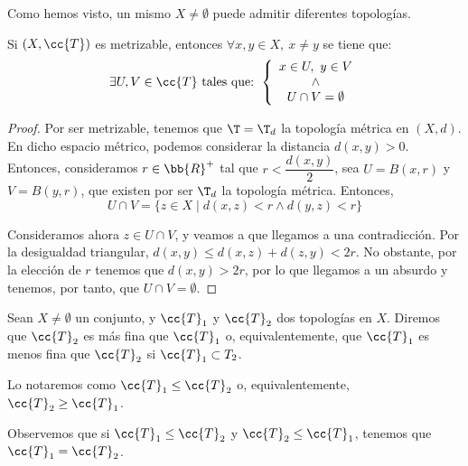 Como hemos visto, un mismo $X\neq \emptyset$ puede admitir diferentes topologías.


\begin{lema}\label{lema:Metrizable}
    Si $(X,\cc{T})$ es metrizable, entonces $\forall x,y\in X,~x\neq y$ se tiene que:
    \begin{equation*}
        \exists U,V\in \cc{T} \text{ tales que: }
        \left\{
        \begin{array}{c}
            x\in U,~y\in V\\
            \land\\
            U\cap V=\emptyset
        \end{array}
        \right.
    \end{equation*}
\end{lema}
\begin{proof}
    Por ser metrizable, tenemos que $\T=\T_d$ la topología métrica en $(X,d)$. En dicho espacio métrico, podemos considerar la distancia $d(x,y)>0$. Entonces, consideramos $r\in \bb{R}^+$ tal que $r<\dfrac{d(x,y)}{2}$, sea $U=B(x,r)$ y $V=B(y,r)$, que existen por ser $\T_d$ la topología métrica. Entonces,
    $$U\cap V = \{z\in X\mid d(x,z)<r \land d(y,z)<r\}$$

    Consideramos ahora $z\in U\cap V$, y veamos a que llegamos a una contradicción. Por la desigualdad triangular, $d(x,y)\leq d(x,z) + d(z,y)<2r$. No obstante, por la elección de $r$ tenemos que $d(x,y)>2r$, por lo que llegamos a un absurdo y tenemos, por tanto, que $U\cap V=\emptyset$.
\end{proof}


\begin{definicion}
    Sean $X\neq \emptyset$ un conjunto, y $\cc{T}_1$ y $\cc{T}_2$ dos topologías en $X$.
    Diremos que $\cc{T}_2$ es más fina que $\cc{T}_1$ o, equivalentemente, que $\cc{T}_1$ es menos fina que $\cc{T}_2$ si $\cc{T}_1\subset T_2$.

    Lo notaremos como $\cc{T}_1\leq \cc{T}_2$ o, equivalentemente, $\cc{T}_2\geq \cc{T}_1$.
\end{definicion}

\begin{observacion}
    Observemos que si $\cc{T}_1 \leq \cc{T}_2$ y $\cc{T}_2 \leq \cc{T}_1$, tenemos que $\cc{T}_1 = \cc{T}_2$.
\end{observacion}

